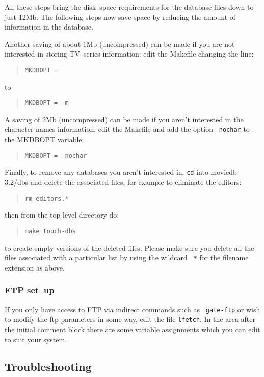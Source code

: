 All these steps bring the disk--space requirements for the database files 
down 
to just 12Mb. The following steps now save space by reducing the amount of
information in the database.

Another saving of about 1Mb (uncompressed) can be made if you are not 
interested in storing TV--series information: edit the Makefile changing 
the
line:
\begin{quote}
{\tt MKDBOPT = }
\end{quote}
to
\begin{quote}
{\tt MKDBOPT = -m}
\end{quote}

A saving of 2Mb (uncompressed) can be made if you aren't interested in
the character names information: edit the Makefile and add the option
{\tt -nochar} to the MKDBOPT variable:

\begin{quote}
{\tt MKDBOPT = -nochar}
\end{quote}

Finally, to remove any databases you aren't interested in, {\tt cd} into
moviedb-3.2/dbs and delete the associated files, for example to eliminate
the editors:

\begin{quote}
{\tt rm editors.*}\\
\end{quote}
then from the top-level directory do:
\begin{quote}
{\tt make touch-dbs}
\end{quote}
to create empty versions of the deleted files. Please make sure you delete
all the files associated with a particular list by using the wildcard {\tt 
*} 
for the filename extension as above.

\subsubsection{FTP set--up}

If you only have access to FTP via indirect commands such as {\tt 
gate-ftp} or
wish to modify the ftp parameters in some way, edit the file {\tt lfetch}. 
In
the area after the initial comment block there are some variable 
assignments
which you can edit to suit your system.

\subsection{Troubleshooting}

